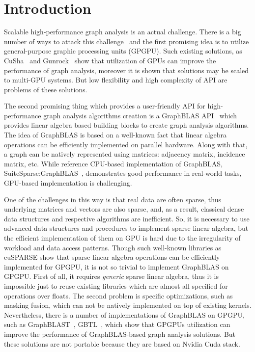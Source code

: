 \section{Introduction}

Scalable high-performance graph analysis is an actual challenge.
There is a big number of ways to attack this challenge~\cite{Coimbra2021} and the first promising idea is to utilize general-purpose graphic processing units (GPGPU).
Such existing solutions, as CuSha~\cite{10.1145/2600212.2600227} and Gunrock~\cite{7967137} show that utilization of GPUs can improve the performance of graph analysis, moreover it is shown that solutions may be scaled to multi-GPU systems.
But low flexibility and high complexity of API are problems of these solutions.

The second promising thing which provides a user-friendly API for high-performance graph analysis algorithms creation is a GraphBLAS API~\cite{7761646} which provides linear algebra based building blocks to create graph analysis algorithms.
The idea of GraphBLAS is based on a well-known fact that linear algebra operations can be efficiently implemented on parallel hardware.
Along with that, a graph can be natively represented using matrices: adjacency matrix, incidence matrix, etc.
While reference CPU-based implementation of GraphBLAS, SuiteSparse:GraphBLAS~\cite{10.1145/3322125}, demonstrates good performance in real-world tasks, GPU-based implementation is challenging.

One of the challenges in this way is that real data are often sparse, thus underlying matrices and vectors are also sparse, and, as a result, classical dense data structures and respective algorithms are inefficient. 
So, it is necessary to use advanced data structures and procedures to implement sparse linear algebra, but the efficient implementation of them on GPU is hard due to the irregularity of workload and data access patterns.
Though such well-known libraries as cuSPARSE show that sparse linear algebra operations can be efficiently implemented for GPGPU, it is not so trivial to implement GraphBLAS on GPGPU. 
First of all, it requires \textit{generic} sparse linear algebra, thus it is impossible just to reuse existing libraries which are almost all specified for operations over floats.
The second problem is specific optimizations, such as masking fusion, which can not be natively implemented on top of existing kernels.
Nevertheless, there is a number of implementations of GraphBLAS on GPGPU, such as GraphBLAST~\cite{yang2019graphblast}, GBTL~\cite{7529957}, which show that GPGPUs utilization can improve the performance of GraphBLAS-based graph analysis solutions.
But these solutions are not portable because they are based on Nvidia Cuda stack.

